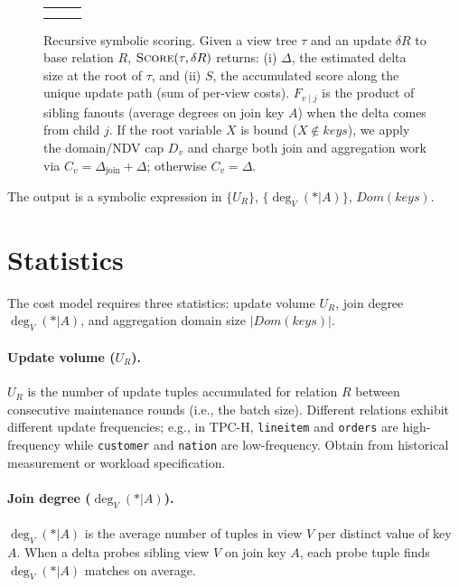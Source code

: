 \documentclass[11pt]{article}
\renewcommand{\deg}{\operatorname{deg}}
\newcommand{\RETURN}{\textbf{return} \hspace{0.1em}}
\newcommand{\VIEW}[1]{#1} %
\begin{document}
\begin{figure}[t]
\begin{tabular}{@{}c@{}c@{~~~~}l@{}}
\begin{minipage}[t]{8.8cm}
\hspace*{0.5em}\RETURN $\bigl(\Delta_{\mathrm{join}},\; S_j + \Delta_{\mathrm{join}}\bigr)$ \\[0.5ex]
    \end{minipage}
    \\
    \bottomrule
\end{tabular}
\caption{Recursive symbolic scoring.
Given a view tree $\tau$ and an update $\VIEW{\delta R}$ to base relation $\VIEW{R}$,
$\textsc{Score}(\tau,\VIEW{\delta R})$ returns: (i) $\Delta$, the estimated delta size at the root of $\tau$,
and (ii) $S$, the accumulated score along the unique update path (sum of per-view costs).
$F_{v\mid j}$ is the product of sibling fanouts (average degrees on join key $A$) when the delta comes from child $j$.
If the root variable $X$ is bound ($X\notin keys$), we apply the domain/NDV cap $D_v$ and charge both join and
aggregation work via $C_v=\Delta_{\mathrm{join}}+\Delta$; otherwise $C_v=\Delta$.}
\label{fig:score_recursive_paperstyle}
\end{figure}
 
The output is a symbolic expression in $\{U_R\}$, $\{\deg_V(*|A)\}$, $Dom(keys)$.

\section{Statistics}

The cost model requires three statistics: update volume $U_R$, join degree $\deg_V(*|A)$, and aggregation domain size $|Dom(keys)|$.

\paragraph{Update volume ($U_R$).}
$U_R$ is the number of update tuples accumulated for relation $R$ between consecutive maintenance rounds (i.e., the batch size).
Different relations exhibit different update frequencies; e.g., in TPC-H, \texttt{lineitem} and \texttt{orders} are high-frequency while \texttt{customer} and \texttt{nation} are low-frequency.
Obtain from historical measurement or workload specification.

\paragraph{Join degree ($\deg_V(*|A)$).}
$\deg_V(*|A)$ is the average number of tuples in view $V$ per distinct value of key $A$.
When a delta probes sibling view $V$ on join key $A$, each probe tuple finds $\deg_V(*|A)$ matches on average.
\end{document}
